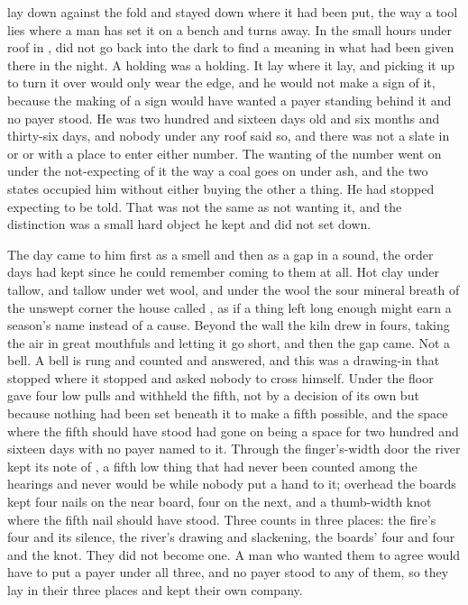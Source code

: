 
 lay down against the fold and stayed down where it had been put, the way a tool lies where a man has set it on a bench and turns away. In the small hours under  roof in ,  did not go back into the dark to find a meaning in what had been given there in the night. A holding was a holding. It lay where it lay, and picking it up to turn it over would only wear the edge, and he would not make a sign of it, because the making of a sign would have wanted a payer standing behind it and no payer stood. He was two hundred and sixteen days old and six months and thirty-six days, and nobody under any roof said so, and there was not a slate in  or  or  with a place to enter either number. The wanting of the number went on under the not-expecting of it the way a coal goes on under ash, and the two states occupied him without either buying the other a thing. He had stopped expecting to be told. That was not the same as not wanting it, and the distinction was a small hard object he kept and did not set down.

The day came to him first as a smell and then as a gap in a sound, the order days had kept since he could remember coming to them at all. Hot clay under tallow, and tallow under wet wool, and under the wool the sour mineral breath of the unswept corner the house called , as if a thing left long enough might earn a season's name instead of a cause. Beyond the wall the kiln drew in fours, taking the air in great mouthfuls and letting it go short, and then the gap came. Not a bell. A bell is rung and counted and answered, and this was a drawing-in that stopped where it stopped and asked nobody to cross himself. Under the floor  gave four low pulls and withheld the fifth, not by a decision of its own but because nothing had been set beneath it to make a fifth possible, and the space where the fifth should have stood had gone on being a space for two hundred and sixteen days with no payer named to it. Through the finger's-width door the river kept its note of , a fifth low thing that had never been counted among the hearings and never would be while nobody put a hand to it; overhead the boards kept four nails on the near board, four on the next, and a thumb-width knot where the fifth nail should have stood. Three counts in three places: the fire's four and its silence, the river's drawing and slackening, the boards' four and four and the knot. They did not become one. A man who wanted them to agree would have to put a payer under all three, and no payer stood to any of them, so they lay in their three places and kept their own company.


